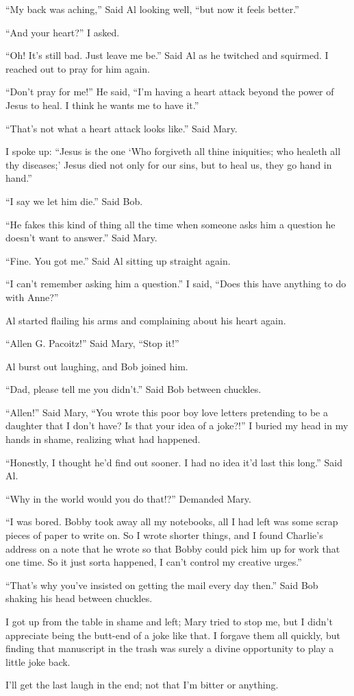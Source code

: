 ``My back was aching,'' Said Al looking well, ``but now it feels better.''

``And your heart?'' I asked.

``Oh! It's still bad. Just leave me be.'' Said Al as he twitched and squirmed. I reached out to pray for him again.

``Don't pray for me!'' He said, ``I'm having a heart attack beyond the power of Jesus to heal. I think he wants me to have it.''

``That's not what a heart attack looks like.'' Said Mary.

I spoke up: ``Jesus is the one `Who forgiveth all thine iniquities; who healeth all thy diseases;' Jesus died not only for our sins, but to heal us, they go hand in hand.''

``I say we let him die.'' Said Bob.

``He fakes this kind of thing all the time when someone asks him a question he doesn't want to answer.'' Said Mary.

``Fine. You got me.'' Said Al sitting up straight again.

``I can't remember asking him a question.'' I said, ``Does this have anything to do with Anne?''

Al started flailing his arms and complaining about his heart again.

``Allen G. Pa\-co\-itz!'' Said Mary, ``Stop it!''

Al burst out laughing, and Bob joined him.

``Dad, please tell me you didn't.'' Said Bob between chuckles.

``Allen!'' Said Mary, ``You wrote this poor boy love letters pretending to be a daughter that I don't have? Is that your idea of a joke?!''
 I buried my head in my hands in shame, realizing what had happened.

``Honestly, I thought he'd find out sooner. I had no idea it'd last this long.'' Said Al.

``Why in the world would you do that!?'' Demanded Mary.

``I was bored. Bobby took away all my notebooks, all I had left was some scrap pieces of paper to write on. So I wrote shorter things, and I found Charlie's address on a note that he wrote so that Bobby could pick him up for work that one time. So it just sorta happened, I can't control my creative urges.''

``That's why you've insisted on getting the mail every day then.'' Said Bob shaking his head between chuckles.

I got up from the table in shame and left; Mary tried to stop me, but I didn't appreciate being the butt-end of a joke like that. I forgave them all quickly, but finding that manuscript in the trash was surely a divine opportunity to play a little joke back.

I'll get the last laugh in the end; not that I'm bitter or anything.

